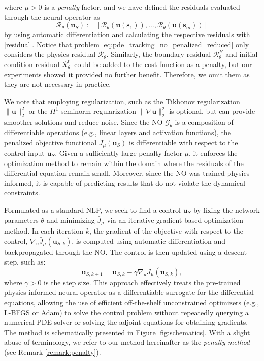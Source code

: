 \documentclass[final,1p,times]{elsarticle}
\newcommand{\Ltwo}[1]{\|#1\|_{2}^2}
\theoremstyle{plain} %
\theoremstyle{definition} %
\theoremstyle{remark} %
\begin{document}
%
where $\mu>0$ is a \textit{penalty} factor, and we have defined the residuals evaluated through the neural operator as
\begin{equation}\label{eq:residual_NO}
\mathcal{R}_\theta(\mathbf{u}_S)
:= [\mathcal{R}_\theta(\mathbf{u}(\mathbf{s}_1)),\dots,\mathcal{R}_\theta(\mathbf{u}(\mathbf{s}_m))]
\end{equation}
by using automatic differentiation and calculating the respective residuals with \eqref{residual}.
Notice that problem \eqref{eq:pde_tracking_no_penalized_reduced} only considers the physics residual $\mathcal{R}_\theta$. Similarly, the boundary residual $\mathcal{R}_\theta^B$ and initial condition residual $\mathcal{R}_\theta^{t_0}$ could be added to the cost function as a penalty, but our experiments showed it provided no further benefit. Therefore, we omit them as they are not necessary in practice.

We note that employing regularization, such as the Tikhonov regularization $\Ltwo{\mathbf{u}}$ or the $H^1$-seminorm regularization $\Ltwo{\nabla \mathbf{u}}$ is optional, but can provide smoother solutions and reduce noise. Since the NO $\mathcal{G}_\theta$ is a composition of differentiable operations (e.g., linear layers and activation functions), the penalized objective functional $\bar{J}_\mu(\mathbf{u}_S)$ is differentiable with respect to the control input $\mathbf{u}_S$. Given a sufficiently large penalty factor $\mu$, it enforces the optimization method to remain within the domain where the residuals of the differential equation remain small. Moreover, since the NO was trained physics-informed, it is capable of predicting results that do not violate the dynamical constraints.

Formulated as a standard NLP, we seek to find a control $\mathbf{u}_S$ by fixing the network parameters $\theta$ and minimizing $\bar{J}_\mu$ via an iterative gradient-based optimization method. In each iteration $k$, the gradient of the objective with respect to the control, $\nabla_u \bar{J}_\mu(\mathbf{u}_{S,k})$, is computed using automatic differentiation and backpropagated through the NO. The control is then updated using a descent step, such as:
\begin{equation}\label{eq:gradient_descent}
\mathbf{u}_{S,{k+1}} = \mathbf{u}_{S,k} - \gamma \nabla_u \bar{J}_\mu(\mathbf{u}_{S,k}),
\end{equation}
where $\gamma > 0$ is the step size. This approach effectively treats the pre-trained physics-informed neural operator as a differentiable surrogate for the differential equations, allowing the use of efficient off-the-shelf unconstrained optimizers (e.g., L-BFGS or Adam) to solve the control problem without repeatedly querying a numerical PDE solver or solving the adjoint equations for obtaining gradients. The method is schematically presented in Figure \ref{fig:schematics}. With a slight abuse of terminology, we refer to our method hereinafter as the \textit{penalty method} (see Remark \ref{remark:penalty}).
\end{document}
